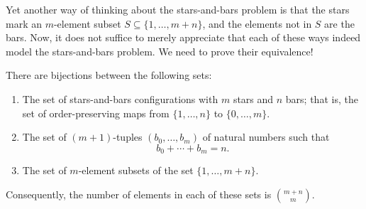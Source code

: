 Yet another way of thinking about the stars-and-bars problem is that the stars mark an $m$-element subset $S\subseteq \{1,\ldots,m+n\}$, and the elements not in $S$ are the bars. Now, it does not suffice to merely appreciate that each of these ways indeed model the stars-and-bars problem. We need to prove their equivalence!

\begin{theorem}\label{theorem:stars-and-bars}
  There are bijections between the following sets:
  \begin{enumerate}
  \item The set of stars-and-bars configurations with $m$ stars and $n$ bars; that is, the set of order-preserving maps from $\{1,\ldots,n\}$ to $\{0,\ldots,m\}$. 
  \item The set of $(m+1)$-tuples $(b_0,\ldots,b_m)$ of natural numbers such that
    \begin{equation*}
      b_0+\cdots+b_m=n.
    \end{equation*}
  \item The set of $m$-element subsets of the set $\{1,\ldots,m+n\}$.
  \end{enumerate}
  Consequently, the number of elements in each of these sets is $\binom{m+n}{m}$.
\end{theorem}

